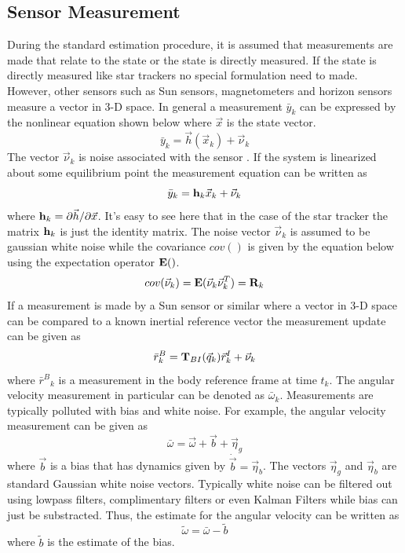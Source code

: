 \documentclass{article}
\begin{document}
\subsection{Sensor Measurement} \label{s:measurements}

During the standard estimation procedure, it is assumed that
measurements are made that relate to the state or the state is
directly measured. If the state is directly measured like star trackers no special formulation need to
made. However, other sensors such as Sun sensors, magnetometers and
horizon sensors measure a vector in 3-D space. In general a
measurement $\bar{y}_k$ can be expressed by the nonlinear equation
shown below where $\vec{x}$ is the state vector. 
\begin{equation}
  \bar{y}_k = \vec{h}(\vec{x}_k) + \vec{\nu}_k
\end{equation}
The vector $\vec{\nu}_k$ is noise associated with the sensor
\cite{Munoz,cassidis}. If the system is linearized about some
equilibrium point the measurement equation can be written as
\begin{equation}
  \bar{y}_k = {\bf h}_k\vec{x}_k + \vec{\nu}_k
\end{equation}
where ${\bf h}_k = \partial \vec{h}/\partial \vec{x}$. 
It's easy to see here that in the case of the star tracker the matrix
${\bf h}_k$ is just the identity matrix. The noise vector
$\vec{\nu}_k$ is assumed to be gaussian white noise while the
covariance $cov()$ is given by the equation below using the
expectation operator ${\bf E}()$.
\begin{equation}
  cov(\vec{\nu}_k) = {\bf E}(\vec{\nu}_k\vec{\nu}_k^T) = {\bf R}_k
\end{equation}
If a measurement is made by a
Sun sensor or similar where a vector in 3-D space can be compared to a
known inertial reference vector the measurement update can be given as 
\begin{equation}
  {\bar{r}^B}_k = {\bf T}_{BI}(\vec{q}_k){\vec{r}^I}_k + \vec{\nu}_k
\end{equation}
where ${\bar{r}^B}_k$ is a measurement in the body reference frame at
time $t_k$. The angular velocity measurement in particular can be denoted as
$\bar{\omega}_k$. Measurements are typically polluted with bias and
white noise. For example, the angular velocity measurement can be
given as
\begin{equation}
  \bar{\omega} = \vec{\omega} + \vec{b} + \vec{\eta}_g
\end{equation}
where $\vec{b}$ is a bias that has dynamics given by
$\dot{\vec{b}}=\vec{\eta}_b$. The vectors $\vec{\eta}_g$ and
$\vec{\eta}_b$ are standard Gaussian white noise vectors. Typically
white noise can be filtered out using lowpass filters, complimentary
filters or even Kalman Filters while bias can just be
substracted. Thus, the estimate for the angular velocity can be
written as
\begin{equation}
  \tilde{\omega} = \bar{\omega}-\tilde{b}
\end{equation}
where $\tilde{b}$ is the estimate of the bias.
\end{document}
